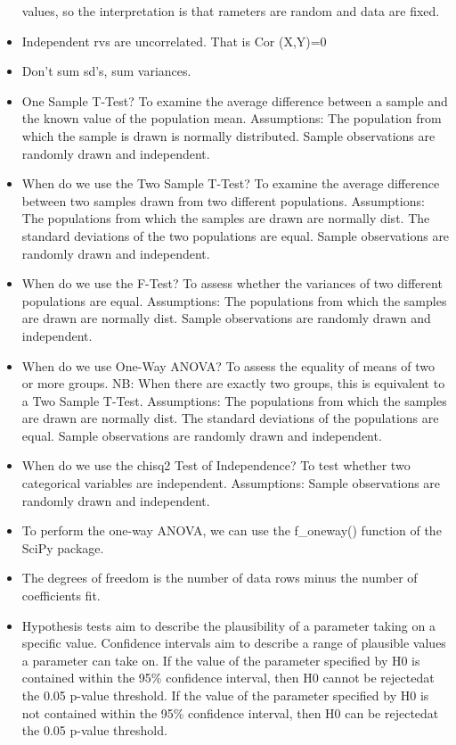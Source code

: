 \documentclass[]{book}
\begin{document}
\begin{itemize}
  values, so the interpretation is that rameters are random and data are
  fixed.
\item
  Independent rvs are uncorrelated. That is Cor (X,Y)=0
\item
  Don't sum sd's, sum variances.
\item
  One Sample T-Test? To examine the average difference between a sample
  and the known value of the population mean. Assumptions: The
  population from which the sample is drawn is normally distributed.
  Sample observations are randomly drawn and independent.
\item
  When do we use the Two Sample T-Test? To examine the average
  difference between two samples drawn from two different populations.
  Assumptions: The populations from which the samples are drawn are
  normally dist. The standard deviations of the two populations are
  equal. Sample observations are randomly drawn and independent.
\item
  When do we use the F-Test? To assess whether the variances of two
  different populations are equal. Assumptions: The populations from
  which the samples are drawn are normally dist. Sample observations are
  randomly drawn and independent.
\item
  When do we use One-Way ANOVA? To assess the equality of means of two
  or more groups. NB: When there are exactly two groups, this is
  equivalent to a Two Sample T-Test. Assumptions: The populations from
  which the samples are drawn are normally dist. The standard deviations
  of the populations are equal. Sample observations are randomly drawn
  and independent.
\item
  When do we use the chisq2 Test of Independence? To test whether two
  categorical variables are independent. Assumptions: Sample
  observations are randomly drawn and independent.
\item
  To perform the one-way ANOVA, we can use the f\_oneway() function of
  the SciPy package.
\item
  The degrees of freedom is the number of data rows minus the number of
  coefficients fit.
\item
  Hypothesis tests aim to describe the plausibility of a parameter
  taking on a specific value. Confidence intervals aim to describe a
  range of plausible values a parameter can take on. If the value of the
  parameter specified by H0 is contained within the 95\% confidence
  interval, then H0 cannot be rejectedat the 0.05 p-value threshold. If
  the value of the parameter specified by H0 is not contained within the
  95\% confidence interval, then H0 can be rejectedat the 0.05 p-value
  threshold.
\end{itemize}
\end{document}
